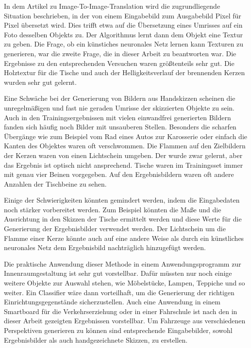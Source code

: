 In dem Artikel zu Image-To-Image-Translation wird die zugrundliegende Situation beschrieben, in der von einem Eingabebild zum Ausgabebild Pixel für Pixel übersetzt wird. Dies trifft etwa auf die Übersetzung eines Umrisses auf ein Foto desselben Objekts zu. Der Algorithmus lernt dann dem Objekt eine Textur zu geben. Die Frage, ob ein künstiches neuronales Netz lernen kann Texturen zu generieren, war die zweite Frage, die in dieser Arbeit zu beantworten war. Die Ergebnisse zu den entsprechenden Versuchen waren größtenteils sehr gut. Die Holztextur für die Tische und auch der Helligkeitsverlauf der brennenden Kerzen wurden sehr gut gelernt.

Eine Schwäche bei der Generierung von Bildern aus Handskizzen scheinen die unregelmäßigen und fast nie geraden Umrisse der skizzierten Objekte zu sein. Auch in den Trainingsergebnissen mit vielen einwandfrei generierten Bildern fanden sich häufig noch Bilder mit unsauberen Stellen. Besonders die scharfen Übergänge wie zum Beispiel vom Rad eines Autos zur Karosserie oder einfach die Kanten des Objektes waren oft verschwommen. Die Flammen auf den Zielbildern der Kerzen waren von einen Lichtschein umgeben. Der wurde zwar gelernt, aber das Ergebnis ist optisch nicht ansprechend. Tische waren im Trainingsset immer mit genau vier Beinen vorgegeben. Auf den Ergebnisbildern waren oft andere Anzahlen der Tischbeine zu sehen.

Einige der Schwierigkeiten könnten gemindert werden, indem die Eingabedaten noch stärker vorbereitet werden. Zum Beispiel könnten die Maße und die Ausrichtung in den Skizzen der Tische ermittelt werden und diese Werte für die Generierung der Ergebnisbilder verwendet werden. Der Lichtschein um die Flamme einer Kerze könnte auch auf eine andere Weise als durch ein künstliches neuronales Netz dem Ergebnisbild nachträglich hinzugefügt werden.

Die praktische Anwendung dieser Methode in einem Anwendungsprogramm zur Innenraumgestaltung ist sehr gut vorstellbar. Dafür müssten nur noch einige weitere Objekte zur Auswahl stehen, wie Möbelstücke, Lampen, Teppiche und so weiter. Ein Classifier wäre dann vorteilhaft, um die Generierung der richtigen Einrichtungsgegenstände sicherzustellen. Auch eine Anwendung in einem Smartboard für die Verkehrserziehung oder in einer Fahrschule ist nach den in dieser Arbeit gezeigten Ergebnissen vorstellbar. Um Fahrzeuge aus verschiedenen Perspektiven generieren zu können sind entsprechende Eingabebilder, sowohl Ergebnisbilder als auch handgezeichnete Skizzen, zu erstellen.
